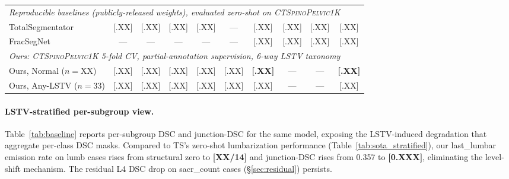 \documentclass{article}
\newcommand{\dataset}{\textsc{CTSpinoPelvic1K}}
\newcommand{\TS}{TotalSegmentator}
\newcommand{\sota}{TS}
\begin{document}
\begin{table}[t]
\begin{tabular}{lccccccccc}
\midrule
\multicolumn{10}{l}{\emph{Reproducible baselines (publicly-released weights), evaluated zero-shot on \dataset{}}} \\
\TS{}~\citep{Wasserthal2023TotalSegmentator:Images}  & [.XX] & [.XX] & [.XX] & [.XX] & ---   & [.XX] & [.XX] & [.XX] & [.XX] \\
FracSegNet~\citep{Liu2025AutomaticDataset}            & ---   & ---   & ---   & ---   & ---   & [.XX] & [.XX] & [.XX] & [.XX] \\
\midrule
\multicolumn{10}{l}{\emph{Ours: \dataset{} 5-fold CV, partial-annotation supervision, 6-way LSTV taxonomy}} \\
Ours, Normal ($n{=}$XX)   & [.XX] & [.XX] & [.XX] & [.XX] & [.XX] & \textbf{[.XX]} & --- & --- & \textbf{[.XX]} \\
Ours, Any-LSTV ($n{=}$33) & [.XX] & [.XX] & [.XX] & [.XX] & [.XX] & [.XX]          & --- & --- & [.XX] \\
\bottomrule
\end{tabular}
\end{table}

\paragraph{LSTV-stratified per-subgroup view.}
Table~\ref{tab:baseline} reports per-subgroup DSC and
junction-DSC for the same model, exposing the
LSTV-induced degradation that aggregate per-class DSC
masks. Compared to \sota{}'s zero-shot lumbarization
performance (Table~\ref{tab:sota_stratified}), our
last\_lumbar emission rate on lumb cases rises from
structural zero to \textbf{[XX/14]} and junction-DSC rises
from 0.357 to \textbf{[0.XXX]}, eliminating the level-shift
mechanism. The residual L4 DSC drop on sacr\_count cases
(\S\ref{sec:residual}) persists.
\end{document}
